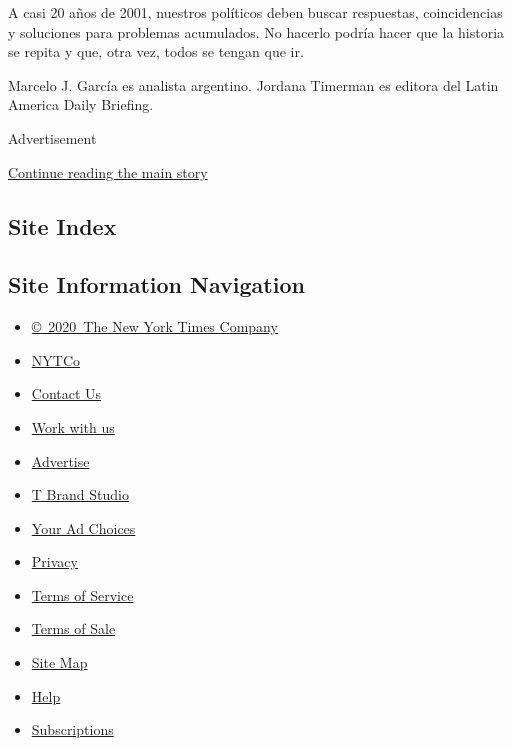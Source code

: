 A casi 20 años de 2001, nuestros políticos deben buscar respuestas,
coincidencias y soluciones para problemas acumulados. No hacerlo podría
hacer que la historia se repita y que, otra vez, todos se tengan que ir.

Marcelo J. García es analista argentino. Jordana Timerman es editora del
Latin America Daily Briefing.

Advertisement

\protect\hyperlink{after-bottom}{Continue reading the main story}

\hypertarget{site-index}{%
\subsection{Site Index}\label{site-index}}

\hypertarget{site-information-navigation}{%
\subsection{Site Information
Navigation}\label{site-information-navigation}}

\begin{itemize}
\tightlist
\item
  \href{https://help.nytimes.com/hc/en-us/articles/115014792127-Copyright-notice}{©~2020~The
  New York Times Company}
\end{itemize}

\begin{itemize}
\tightlist
\item
  \href{https://www.nytco.com/}{NYTCo}
\item
  \href{https://help.nytimes.com/hc/en-us/articles/115015385887-Contact-Us}{Contact
  Us}
\item
  \href{https://www.nytco.com/careers/}{Work with us}
\item
  \href{https://nytmediakit.com/}{Advertise}
\item
  \href{http://www.tbrandstudio.com/}{T Brand Studio}
\item
  \href{https://www.nytimes.com/privacy/cookie-policy\#how-do-i-manage-trackers}{Your
  Ad Choices}
\item
  \href{https://www.nytimes.com/privacy}{Privacy}
\item
  \href{https://help.nytimes.com/hc/en-us/articles/115014893428-Terms-of-service}{Terms
  of Service}
\item
  \href{https://help.nytimes.com/hc/en-us/articles/115014893968-Terms-of-sale}{Terms
  of Sale}
\item
  \href{https://spiderbites.nytimes.com}{Site Map}
\item
  \href{https://help.nytimes.com/hc/en-us}{Help}
\item
  \href{https://www.nytimes.com/subscription?campaignId=37WXW}{Subscriptions}
\end{itemize}
